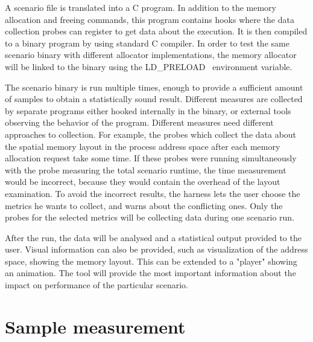 \documentclass{eeict}
\begin{document}
A scenario file is translated into a C program. In addition to the memory allocation and freeing commands, this program contains hooks where the data collection probes can register to get data about the execution. It is then compiled to a binary program by using standard C compiler. In order to test the same scenario binary with different allocator implementations, the memory allocator will be linked to the binary using the LD\_PRELOAD~\cite{cman} environment variable.

The scenario binary is run multiple times, enough to provide a sufficient amount of samples to obtain a statistically sound result. Different measures are collected by separate programs either hooked internally in the binary, or external tools observing the behavior of the program. Different measures need different approaches to collection. For example, the probes which collect the data about the spatial memory layout in the process address space after each memory allocation request take some time. If these probes were running simultaneously with the probe measuring the total scenario runtime, the time measurement would be incorrect, because they would contain the overhead of the layout examination. To avoid the incorrect results, the harness lets the user choose the metrics he wants to collect, and warns about the conflicting ones. Only the probes for the selected metrics will be collecting data during one scenario run.

After the run, the data will be analysed and a statistical output provided to the user. Visual information can also be provided, such as visualization of the address space, showing the memory layout. This can be extended to a "player" showing an animation. The tool will provide the most important information about the impact on performance of the particular scenario.

\section{Sample measurement}
\end{document}
